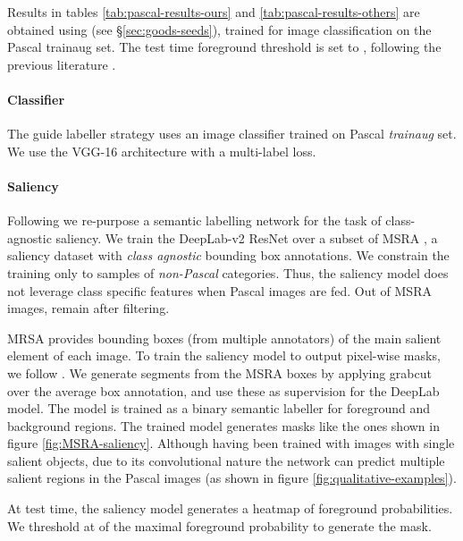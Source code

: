 \documentclass[british,10pt,twocolumn,letterpaper]{article}
\begin{document}
Results in tables \ref{tab:pascal-results-ours} and \ref{tab:pascal-results-others}
are obtained using  (see \S\ref{sec:goods-seeds}),
trained for image classification on the Pascal trainaug set. The test
time foreground threshold  is set to , following the
previous literature \cite{zhou2015cnnlocalization,kolesnikov2016seed}.

\paragraph{ \label{par:G1-Classifier-details}Classifier}

The guide labeller strategy  uses an image classifier
trained on Pascal \textit{trainaug} set. We use the VGG-16 architecture \cite{Simonyan2015Iclr}
with a multi-label loss. 

\paragraph{\label{sec:Saliency-details}Saliency}

Following \cite{Zhao2015Cvpr,Li2016Tip,Li2016Cvpr} we re-purpose
a semantic labelling network for the task of class-agnostic saliency.
 We train the DeepLab-v2 ResNet \cite{Chen2016ArxivDeeplabv2} over
  a subset of MSRA \cite{liu2011learning}, a saliency dataset with
  \emph{class agnostic} bounding box annotations. We constrain the training
  only to samples of \emph{non-Pascal} categories. Thus, the saliency
  model does not leverage class specific features when Pascal images
  are fed. Out of  MSRA images,  remain after filtering. 
  
MRSA provides bounding boxes (from multiple annotators) of the main
salient element of each image. To train the saliency model to output
pixel-wise masks, we follow \cite{Khoreva2016Arxiv}. We generate
segments from the MSRA boxes by applying grabcut over the average
box annotation, and use these as supervision for the DeepLab model.
The model is trained as a binary semantic labeller for foreground
and background regions. The trained model generates masks like the
ones shown in figure \ref{fig:MSRA-saliency}. Although having been
trained with images with single salient objects, due to its convolutional
nature the network can predict multiple salient regions in the Pascal
images (as shown in figure \ref{fig:qualitative-examples}).

At test time, the saliency model generates a heatmap of foreground
probabilities. We threshold at  of the maximal foreground
probability to generate the mask.
\end{document}
